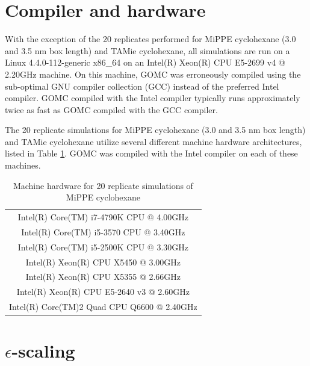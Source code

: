 \documentclass[journal=jctc,manuscript=article]{achemso}
\begin{document}
\newpage
\clearpage

\section{Compiler and hardware} \label{SI sec: Machine hardware}

With the exception of the 20 replicates performed for MiPPE cyclohexane (3.0 and 3.5 nm box length) and TAMie cyclohexane, all simulations are run on a Linux 4.4.0-112-generic x86\_64 on an Intel(R) Xeon(R) CPU E5-2699 v4 @ 2.20GHz machine. On this machine, GOMC was erroneously compiled using the sub-optimal GNU compiler collection (GCC) instead of the preferred Intel compiler. GOMC compiled with the Intel compiler typically runs approximately twice as fast as GOMC compiled with the GCC compiler.

The 20 replicate simulations for MiPPE cyclohexane (3.0 and 3.5 nm box length) and TAMie cyclohexane utilize several different machine hardware architectures, listed in Table \ref{SI tab: Machine hardware}. GOMC was compiled with the Intel compiler on each of these machines.

\begin{table}[htb!]
	\caption{Machine hardware for 20 replicate simulations of MiPPE cyclohexane} \label{SI tab: Machine hardware}
	\begin{center}
		\begin{tabular}{|c|}
			\hline
			Intel(R) Core(TM) i7-4790K CPU @ 4.00GHz \\
			Intel(R) Core(TM) i5-3570 CPU @ 3.40GHz \\
			Intel(R) Core(TM) i5-2500K CPU @ 3.30GHz \\
			Intel(R) Xeon(R) CPU X5450 @ 3.00GHz \\
			Intel(R) Xeon(R) CPU X5355 @ 2.66GHz \\
			Intel(R) Xeon(R) CPU E5-2640 v3 @ 2.60GHz \\
			Intel(R) Core(TM)2 Quad CPU Q6600 @ 2.40GHz \\
			\hline
		\end{tabular}
	\end{center}
\end{table}

\newpage
\clearpage

\section{$\epsilon$-scaling} \label{SI sec: eps scale}
\end{document}
